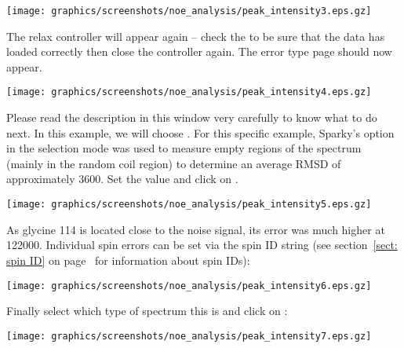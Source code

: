 \begin{minipage}[h]{\linewidth}
\centerline{\texttt{[image: graphics/screenshots/noe\_analysis/peak\_intensity3.eps.gz]}}
\end{minipage}

The relax controller will appear again -- check the  to be sure that the data has loaded correctly then close the controller again.  The error type page should now appear.

\begin{minipage}[h]{\linewidth}
\centerline{\texttt{[image: graphics/screenshots/noe\_analysis/peak\_intensity4.eps.gz]}}
\end{minipage}

Please read the description in this window very carefully to know what to do next.  In this example, we will choose .  For this specific example, Sparky's  option in the  selection mode was used to measure empty regions of the spectrum (mainly in the random coil region) to determine an average RMSD of approximately 3600.  Set the value and click on .

\begin{minipage}[h]{\linewidth}
\centerline{\texttt{[image: graphics/screenshots/noe\_analysis/peak\_intensity5.eps.gz]}}
\end{minipage}

As glycine 114 is located close to the noise signal, its error was much higher at 122000.  Individual spin errors can be set via the spin ID string (see section~\ref{sect: spin ID} on page~\pageref{sect: spin ID} for information about spin IDs):

\begin{minipage}[h]{\linewidth}
\centerline{\texttt{[image: graphics/screenshots/noe\_analysis/peak\_intensity6.eps.gz]}}
\end{minipage}

Finally select which type of spectrum this is and click on :

\begin{minipage}[h]{\linewidth}
\centerline{\texttt{[image: graphics/screenshots/noe\_analysis/peak\_intensity7.eps.gz]}}
\end{minipage}

